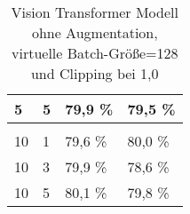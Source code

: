 \begin{table}[!htb]
\begin{tabular}{|llll|}
\multicolumn{1}{|l|}{5}                               & \multicolumn{1}{l|}{5}                                                                                & \multicolumn{1}{l|}{79,9 \%}                              & 79,5 \%            \\ \hline
\multicolumn{1}{|l|}{}                                & \multicolumn{1}{l|}{}                                                                                 & \multicolumn{1}{l|}{}                                     &                    \\ \hline
\multicolumn{1}{|l|}{10}                              & \multicolumn{1}{l|}{1}                                                                                & \multicolumn{1}{l|}{79,6 \%}                              & 80,0 \%            \\ \hline
\multicolumn{1}{|l|}{10}                              & \multicolumn{1}{l|}{3}                                                                                & \multicolumn{1}{l|}{79,9 \%}                              & 78,6 \%            \\ \hline
\multicolumn{1}{|l|}{10}                              & \multicolumn{1}{l|}{5}                                                                                & \multicolumn{1}{l|}{80,1 \%}                              & 79,8 \%            \\ \hline
\end{tabular}
\caption{Vision Transformer Modell ohne Augmentation, virtuelle Batch-Größe=128 und Clipping bei 1,0}
\label{tab:vit_dpsgd2}
\end{table}